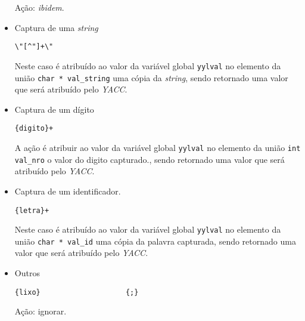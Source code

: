 \begin{itemize}
Ação: \emph{ibidem}. 

	\item Captura de uma \emph{string}  
  
		\verb|\"[^"]+\"|                 

Neste caso é atribuído ao valor da variável global \texttt{yylval} no elemento
da união \texttt{char * val\_string} uma cópia da \emph{string}, sendo retornado
uma valor que será atribuído pelo \emph{YACC}. 

	\item Captura de um dígito
\begin{verbatim}
{digito}+                 
\end{verbatim}

A ação é atribuir ao valor da variável global \texttt{yylval} no elemento
da união \texttt{int val\_nro} o valor do digito capturado., sendo retornado 
uma valor que será atribuído pelo \emph{YACC}. 


	\item Captura de um identificador. 
\begin{verbatim}
{letra}+                  
\end{verbatim}
Neste caso é atribuído ao valor da variável global \texttt{yylval} no elemento
da união \texttt{char * val\_id} uma cópia da palavra capturada, sendo retornado
uma valor que será atribuído pelo \emph{YACC}. 

	\item Outros 
\begin{verbatim}
{lixo}                    {;}
\end{verbatim}

Ação: ignorar.

\end{itemize}
















